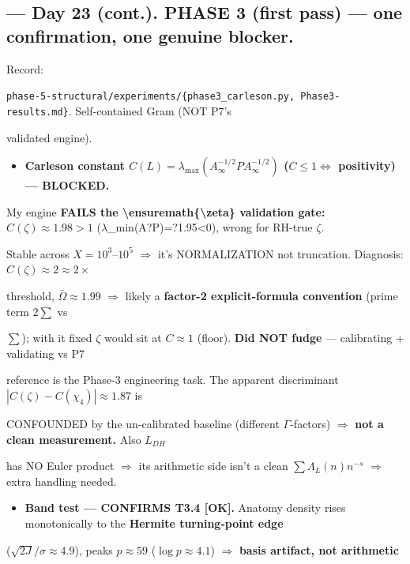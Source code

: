 \documentclass[10pt]{article}
\begin{document}
\subsection*{ --- Day 23 (cont.). PHASE 3 (first pass) --- one confirmation, one genuine blocker.}
Record:\par
\texttt{phase-5-structural/experiments/\{phase3\_carleson.py, Phase3-results.md\}}. Self-contained Gram (NOT P7's\par
validated engine).\par
\begin{itemize}
\item \textbf{Carleson constant $C(L)=\lambda_{\max}(A_\infty^{-1/2}P A_\infty^{-1/2})$ ($C\le1\iff$ positivity) --- BLOCKED.}
\end{itemize}
  My engine \textbf{FAILS the \textbackslash{}ensuremath\{\textbackslash{}zeta\} validation gate:} $C(\zeta)\approx1.98>1$ (\ensuremath{\lambda}\_min(A?P)=?1.95<0), wrong for RH-true \ensuremath{\zeta}.\par
  Stable across $X=10^3$--$10^5$ \ensuremath{\Rightarrow} it's NORMALIZATION not truncation. Diagnosis: $C(\zeta)\approx2\approx2\times$\par
  threshold, $\bar\Omega\approx1.99$ \ensuremath{\Rightarrow} likely a \textbf{factor-2 explicit-formula convention} (prime term $2\sum$ vs\par
  $\sum$); with it fixed \ensuremath{\zeta} would sit at $C\approx1$ (floor). \textbf{Did NOT fudge} --- calibrating + validating vs P7\par
  reference is the Phase-3 engineering task. The apparent discriminant $|C(\zeta)-C(\chi_4)|\approx1.87$ is\par
  CONFOUNDED by the un-calibrated baseline (different \ensuremath{\Gamma}-factors) \ensuremath{\Rightarrow} \textbf{not a clean measurement.} Also $L_{DH}$\par
  has NO Euler product \ensuremath{\Rightarrow} its arithmetic side isn't a clean $\sum\Lambda_L(n)n^{-s}$ \ensuremath{\Rightarrow} extra handling needed.\par
\begin{itemize}
\item \textbf{Band test --- CONFIRMS T3.4 [OK].} Anatomy density rises monotonically to the \textbf{Hermite turning-point edge}
\end{itemize}
  ($\sqrt{2J}/\sigma\approx4.9$), peaks $p\approx59$ ($\log p\approx4.1$) \ensuremath{\Rightarrow} \textbf{basis artifact, not arithmetic}\par
\end{document}
